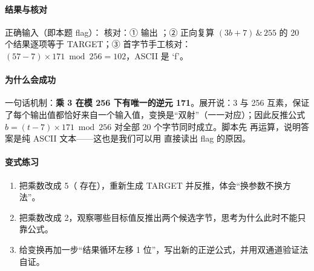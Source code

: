 \documentclass[UTF8,12pt,oneside]{ctexbook}
\begin{document}
\paragraph{结果与核对}
正确输入（即本题 flag）：
核对：①  输出 ；② 正向复算 $(3b+7)\,\&\,255$ 的 20 个结果逐项等于 TARGET；③ 首字节手工核对：$(57-7)\times171 \bmod 256 = 102$，ASCII 是 `f'。

\paragraph{为什么会成功}
一句话机制：\textbf{乘 3 在模 256 下有唯一的逆元 171}。展开说：3 与 256 互素，保证了每个输出值都恰好来自一个输入值，变换是“双射”（一一对应）；因此反推公式 $b=(t-7)\times171\bmod256$ 对全部 20 个字节同时成立。脚本先  再运算，说明答案是纯 ASCII 文本——这也是我们可以用  直接读出 flag 的原因。


\paragraph{变式练习}
\begin{enumerate}
\item 把乘数改成 5（ 存在），重新生成 TARGET 并反推，体会“换参数不换方法”。
\item 把乘数改成 2，观察哪些目标值反推出两个候选字节，思考为什么此时不能只靠公式。
\item 给变换再加一步“结果循环左移 1 位”，写出新的正逆公式，并用双通道验证法自证。
\end{enumerate}
\end{document}
